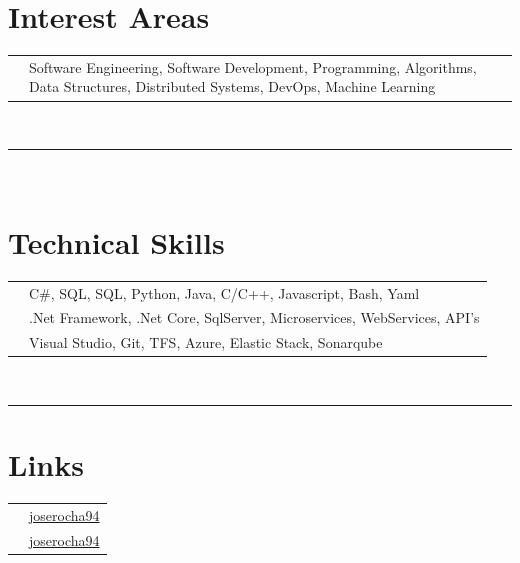 \documentclass[oneside]{article}
\begin{document}
{\begin{minipage}[t][\textheight-2\fboxsep-2\fboxrule][t]{\dimexpr0.4\textwidth-2\fboxrule-2\fboxsep\relax}
        \section*{\normalsize Interest Areas}
        \begin{tabularx}{\textwidth}{cY}
            \faInfo{} & \small Software Engineering, Software Development, Programming, Algorithms, Data Structures, Distributed Systems, DevOps, Machine Learning \\
        \end{tabularx}
        \vspace{0.5cm} \\
        \rule{\linewidth}{0.4pt}
        
        \vspace{0.3 cm} \\
        \section*{\normalsize Technical Skills}
        \begin{tabularx}{\textwidth}{cY}
            \faCode{} & \small C\#, SQL, SQL, Python, Java, C/C++, Javascript, Bash, Yaml \\
            \faLaptopCode{} & \small .Net Framework, .Net Core, SqlServer, Microservices, WebServices, API's \\
            \faToolbox{} & \small Visual Studio, Git, TFS, Azure, Elastic Stack, Sonarqube
        \end{tabularx}
        \vspace{0.5cm} \\
        \rule{\linewidth}{0.4pt}

        \section*{\normalsize Links}
        \begin{tabular}{cl}
            \faLinkedin{} & \small \href{https://www.linkedin.com/in/joserocha94/}{joserocha94} \\
            \faGithub{} & \small \href{https://github.com/joserocha94}{joserocha94} \\
        \end{tabular}
        \vspace{0.5cm} \\
 
    \end{minipage}
}
\end{document}
